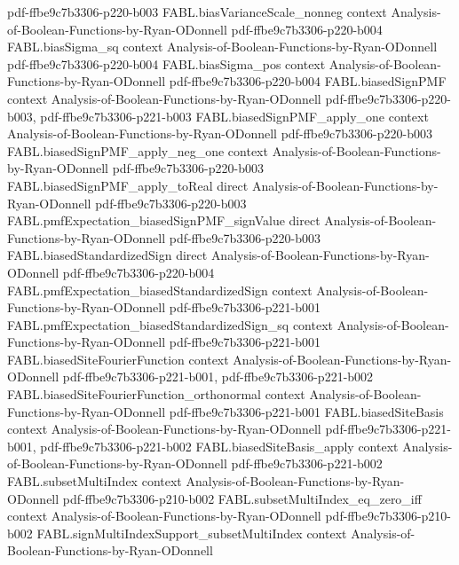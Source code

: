 \begin{theorem}
  {pdf-ffbe9c7b3306-p220-b003}
\proofstep
  {FABL.biasVarianceScale_nonneg}
  {context}
  {Analysis-of-Boolean-Functions-by-Ryan-ODonnell}
  {pdf-ffbe9c7b3306-p220-b004}
\proofstep
  {FABL.biasSigma_sq}
  {context}
  {Analysis-of-Boolean-Functions-by-Ryan-ODonnell}
  {pdf-ffbe9c7b3306-p220-b004}
\proofstep
  {FABL.biasSigma_pos}
  {context}
  {Analysis-of-Boolean-Functions-by-Ryan-ODonnell}
  {pdf-ffbe9c7b3306-p220-b004}
\proofstep
  {FABL.biasedSignPMF}
  {context}
  {Analysis-of-Boolean-Functions-by-Ryan-ODonnell}
  {pdf-ffbe9c7b3306-p220-b003,
    pdf-ffbe9c7b3306-p221-b003}
\proofstep
  {FABL.biasedSignPMF_apply_one}
  {context}
  {Analysis-of-Boolean-Functions-by-Ryan-ODonnell}
  {pdf-ffbe9c7b3306-p220-b003}
\proofstep
  {FABL.biasedSignPMF_apply_neg_one}
  {context}
  {Analysis-of-Boolean-Functions-by-Ryan-ODonnell}
  {pdf-ffbe9c7b3306-p220-b003}
\proofstep
  {FABL.biasedSignPMF_apply_toReal}
  {direct}
  {Analysis-of-Boolean-Functions-by-Ryan-ODonnell}
  {pdf-ffbe9c7b3306-p220-b003}
\proofstep
  {FABL.pmfExpectation_biasedSignPMF_signValue}
  {direct}
  {Analysis-of-Boolean-Functions-by-Ryan-ODonnell}
  {pdf-ffbe9c7b3306-p220-b003}
\proofstep
  {FABL.biasedStandardizedSign}
  {direct}
  {Analysis-of-Boolean-Functions-by-Ryan-ODonnell}
  {pdf-ffbe9c7b3306-p220-b004}
\proofstep
  {FABL.pmfExpectation_biasedStandardizedSign}
  {context}
  {Analysis-of-Boolean-Functions-by-Ryan-ODonnell}
  {pdf-ffbe9c7b3306-p221-b001}
\proofstep
  {FABL.pmfExpectation_biasedStandardizedSign_sq}
  {context}
  {Analysis-of-Boolean-Functions-by-Ryan-ODonnell}
  {pdf-ffbe9c7b3306-p221-b001}
\proofstep
  {FABL.biasedSiteFourierFunction}
  {context}
  {Analysis-of-Boolean-Functions-by-Ryan-ODonnell}
  {pdf-ffbe9c7b3306-p221-b001,
    pdf-ffbe9c7b3306-p221-b002}
\proofstep
  {FABL.biasedSiteFourierFunction_orthonormal}
  {context}
  {Analysis-of-Boolean-Functions-by-Ryan-ODonnell}
  {pdf-ffbe9c7b3306-p221-b001}
\proofstep
  {FABL.biasedSiteBasis}
  {context}
  {Analysis-of-Boolean-Functions-by-Ryan-ODonnell}
  {pdf-ffbe9c7b3306-p221-b001,
    pdf-ffbe9c7b3306-p221-b002}
\proofstep
  {FABL.biasedSiteBasis_apply}
  {context}
  {Analysis-of-Boolean-Functions-by-Ryan-ODonnell}
  {pdf-ffbe9c7b3306-p221-b002}
\proofstep
  {FABL.subsetMultiIndex}
  {context}
  {Analysis-of-Boolean-Functions-by-Ryan-ODonnell}
  {pdf-ffbe9c7b3306-p210-b002}
\proofstep
  {FABL.subsetMultiIndex_eq_zero_iff}
  {context}
  {Analysis-of-Boolean-Functions-by-Ryan-ODonnell}
  {pdf-ffbe9c7b3306-p210-b002}
\proofstep
  {FABL.signMultiIndexSupport_subsetMultiIndex}
  {context}
  {Analysis-of-Boolean-Functions-by-Ryan-ODonnell}

\end{theorem}
